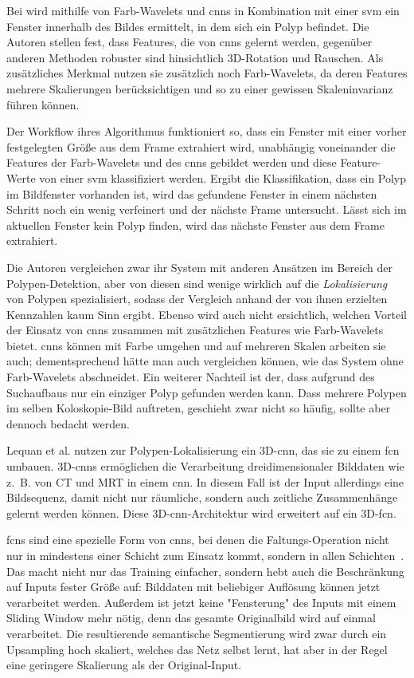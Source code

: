 Bei \cite{Billah.2017} wird mithilfe von Farb-Wavelets und \glspl{cnn} in Kombination mit einer \gls{svm} ein Fenster innerhalb des Bildes ermittelt, in dem sich ein Polyp befindet.
Die Autoren stellen fest, dass Features, die von \glspl{cnn} gelernt werden, gegenüber anderen Methoden robuster sind hinsichtlich 3D-Rotation und Rauschen.
Als zusätzliches Merkmal nutzen sie zusätzlich noch Farb-Wavelets, da deren Features mehrere Skalierungen berücksichtigen und so zu einer gewissen Skaleninvarianz führen können.

Der Workflow ihres Algorithmus funktioniert so, dass ein Fenster mit einer vorher festgelegten Größe aus dem Frame extrahiert wird, unabhängig voneinander die Features der Farb-Wavelets und des \gls{cnn}s gebildet werden und diese Feature-Werte von einer \gls{svm} klassifiziert werden.
Ergibt die Klassifikation, dass ein Polyp im Bildfenster vorhanden ist, wird das gefundene Fenster in einem nächsten Schritt noch ein wenig verfeinert und der nächste Frame untersucht.
Lässt sich im aktuellen Fenster kein Polyp finden, wird das nächste Fenster aus dem Frame extrahiert.

Die Autoren vergleichen zwar ihr System mit anderen Ansätzen im Bereich der Polypen-Detektion, aber von diesen sind wenige wirklich auf die \emph{Lokalisierung} von Polypen spezialisiert, sodass der Vergleich anhand der von ihnen erzielten Kennzahlen kaum Sinn ergibt.
Ebenso wird auch nicht ersichtlich, welchen Vorteil der Einsatz von \glspl{cnn} zusammen mit zusätzlichen Features wie Farb-Wavelets bietet.
\glspl{cnn} können mit Farbe umgehen und auf mehreren Skalen arbeiten sie auch; dementsprechend hätte man auch vergleichen können, wie das System ohne Farb-Wavelets abschneidet.
Ein weiterer Nachteil ist der, dass aufgrund des Suchaufbaus nur ein einziger Polyp gefunden werden kann.
Dass mehrere Polypen im selben Koloskopie-Bild auftreten, geschieht zwar nicht so häufig, sollte aber dennoch bedacht werden.

Lequan et al. \cite{Lequan.2017} nutzen zur Polypen-Lokalisierung ein 3D-\gls{cnn}, das sie zu einem \gls{fcn} umbauen.
3D-\glspl{cnn} ermöglichen die Verarbeitung dreidimensionaler Bilddaten wie z.~B. von CT und MRT in einem \gls{cnn}.
In diesem Fall ist der Input allerdings eine Bildsequenz, damit nicht nur räumliche, sondern auch zeitliche Zusammenhänge gelernt werden können.
Diese 3D-\gls{cnn}-Architektur wird erweitert auf ein 3D-\gls{fcn}.

\glspl{fcn} sind eine spezielle Form von \glspl{cnn}, bei denen die Faltungs-Operation nicht nur in mindestens einer Schicht zum Einsatz kommt, sondern in allen Schichten~\cite{Long.2015}.
Das macht nicht nur das Training einfacher, sondern hebt auch die Beschränkung auf Inputs fester Größe auf:
Bilddaten mit beliebiger Auflösung können jetzt verarbeitet werden.
Außerdem ist jetzt keine "Fensterung" des Inputs mit einem Sliding Window mehr nötig, denn das gesamte Originalbild wird auf einmal verarbeitet.
Die resultierende semantische Segmentierung wird zwar durch ein Upsampling hoch skaliert, welches das Netz selbst lernt, hat aber in der Regel eine geringere Skalierung als der Original-Input.

